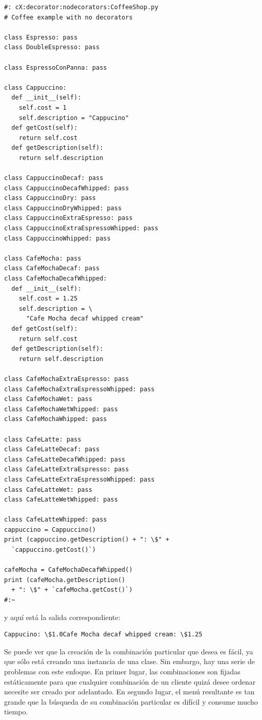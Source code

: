 \documentclass{article}
\begin{document}
\begin{lstlisting}
#: cX:decorator:nodecorators:CoffeeShop.py 
# Coffee example with no decorators 

class Espresso: pass 
class DoubleEspresso: pass

class EspressoConPanna: pass 

class Cappuccino: 
  def __init__(self): 
    self.cost = 1 
    self.description = "Cappucino" 
  def getCost(self): 
    return self.cost 
  def getDescription(self): 
    return self.description 
    
class CappuccinoDecaf: pass 
class CappuccinoDecafWhipped: pass 
class CappuccinoDry: pass 
class CappuccinoDryWhipped: pass 
class CappuccinoExtraEspresso: pass 
class CappuccinoExtraEspressoWhipped: pass 
class CappuccinoWhipped: pass 

class CafeMocha: pass 
class CafeMochaDecaf: pass 
class CafeMochaDecafWhipped: 
  def __init__(self): 
    self.cost = 1.25 
    self.description = \ 
      "Cafe Mocha decaf whipped cream" 
  def getCost(self): 
    return self.cost 
  def getDescription(self): 
    return self.description 
    
class CafeMochaExtraEspresso: pass 
class CafeMochaExtraEspressoWhipped: pass 
class CafeMochaWet: pass 
class CafeMochaWetWhipped: pass 
class CafeMochaWhipped: pass 

class CafeLatte: pass 
class CafeLatteDecaf: pass 
class CafeLatteDecafWhipped: pass 
class CafeLatteExtraEspresso: pass 
class CafeLatteExtraEspressoWhipped: pass 
class CafeLatteWet: pass 
class CafeLatteWetWhipped: pass 

class CafeLatteWhipped: pass 
cappuccino = Cappuccino() 
print (cappuccino.getDescription() + ": \$" +  
  `cappuccino.getCost()`) 
  
cafeMocha = CafeMochaDecafWhipped() 
print (cafeMocha.getDescription() 
  + ": \$" + `cafeMocha.getCost()`) 
#:~ 
\end{lstlisting}

y aquí está la salida correspondiente: \newline

\begin{lstlisting} 
Cappucino: \$1.0Cafe Mocha decaf whipped cream: \$1.25
\end{lstlisting}

Se puede ver que la creación de la combinación particular que desea es fácil, ya que sólo está creando una instancia de una clase. Sin embargo, hay una serie de problemas con este enfoque. En primer lugar, las combinaciones son fijadas estáticamente para que cualquier combinación de un cliente quizá desee ordenar necesite ser creado por adelantado. En segundo lugar, el menú resultante es tan grande que la búsqueda de su combinación particular es difícil y consume mucho tiempo.     \newline
\end{document}
